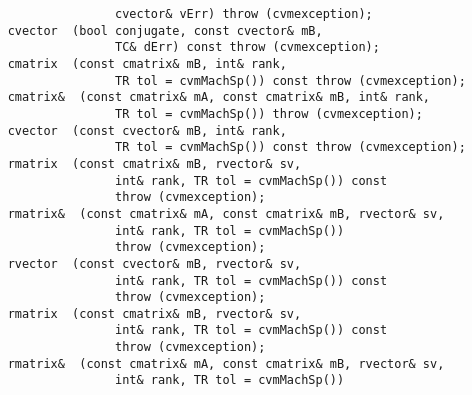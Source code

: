 \verb"                   cvector& vErr) throw (cvmexception);"\\
\verb"    cvector "\verb" (bool conjugate, const cvector& mB,"\\
\verb"                   TC& dErr) const throw (cvmexception);"\\
\verb"    cmatrix "\verb" (const cmatrix& mB, int& rank,"\\
\verb"                   TR tol = cvmMachSp()) const throw (cvmexception);"\\
\verb"    cmatrix& "\verb" (const cmatrix& mA, const cmatrix& mB, int& rank,"\\
\verb"                   TR tol = cvmMachSp()) throw (cvmexception);"\\
\verb"    cvector "\verb" (const cvector& mB, int& rank,"\\
\verb"                   TR tol = cvmMachSp()) const throw (cvmexception);"\\
\verb"    rmatrix "\verb" (const cmatrix& mB, rvector& sv,"\\
\verb"                   int& rank, TR tol = cvmMachSp()) const"\\
\verb"                   throw (cvmexception);"\\
\verb"    rmatrix& "\verb" (const cmatrix& mA, const cmatrix& mB, rvector& sv,"\\
\verb"                   int& rank, TR tol = cvmMachSp())"\\
\verb"                   throw (cvmexception);"\\
\verb"    rvector "\verb" (const cvector& mB, rvector& sv,"\\
\verb"                   int& rank, TR tol = cvmMachSp()) const"\\
\verb"                   throw (cvmexception);"\\
\verb"    rmatrix "\verb" (const cmatrix& mB, rvector& sv,"\\
\verb"                   int& rank, TR tol = cvmMachSp()) const"\\
\verb"                   throw (cvmexception);"\\
\verb"    rmatrix& "\verb" (const cmatrix& mA, const cmatrix& mB, rvector& sv,"\\
\verb"                   int& rank, TR tol = cvmMachSp())"\\
